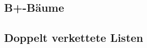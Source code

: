 \subsection{B+-Bäume}\label{sec:b+bäume}
\cite{Knuth1998}	
\subsection{Doppelt verkettete Listen}\label{sec:listen}	


